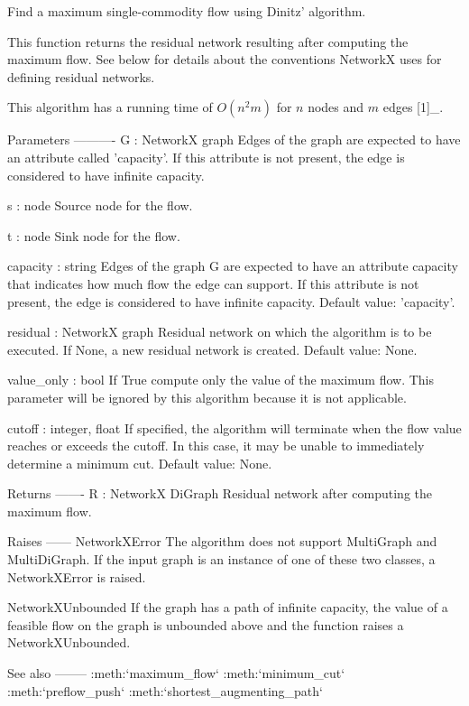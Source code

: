 \begin{DoxyVerb}Find a maximum single-commodity flow using Dinitz' algorithm.

This function returns the residual network resulting after computing
the maximum flow. See below for details about the conventions
NetworkX uses for defining residual networks.

This algorithm has a running time of $O(n^2 m)$ for $n$ nodes and $m$
edges [1]_.


Parameters
----------
G : NetworkX graph
    Edges of the graph are expected to have an attribute called
    'capacity'. If this attribute is not present, the edge is
    considered to have infinite capacity.

s : node
    Source node for the flow.

t : node
    Sink node for the flow.

capacity : string
    Edges of the graph G are expected to have an attribute capacity
    that indicates how much flow the edge can support. If this
    attribute is not present, the edge is considered to have
    infinite capacity. Default value: 'capacity'.

residual : NetworkX graph
    Residual network on which the algorithm is to be executed. If None, a
    new residual network is created. Default value: None.

value_only : bool
    If True compute only the value of the maximum flow. This parameter
    will be ignored by this algorithm because it is not applicable.

cutoff : integer, float
    If specified, the algorithm will terminate when the flow value reaches
    or exceeds the cutoff. In this case, it may be unable to immediately
    determine a minimum cut. Default value: None.

Returns
-------
R : NetworkX DiGraph
    Residual network after computing the maximum flow.

Raises
------
NetworkXError
    The algorithm does not support MultiGraph and MultiDiGraph. If
    the input graph is an instance of one of these two classes, a
    NetworkXError is raised.

NetworkXUnbounded
    If the graph has a path of infinite capacity, the value of a
    feasible flow on the graph is unbounded above and the function
    raises a NetworkXUnbounded.

See also
--------
:meth:`maximum_flow`
:meth:`minimum_cut`
:meth:`preflow_push`
:meth:`shortest_augmenting_path`


\end{DoxyVerb}
